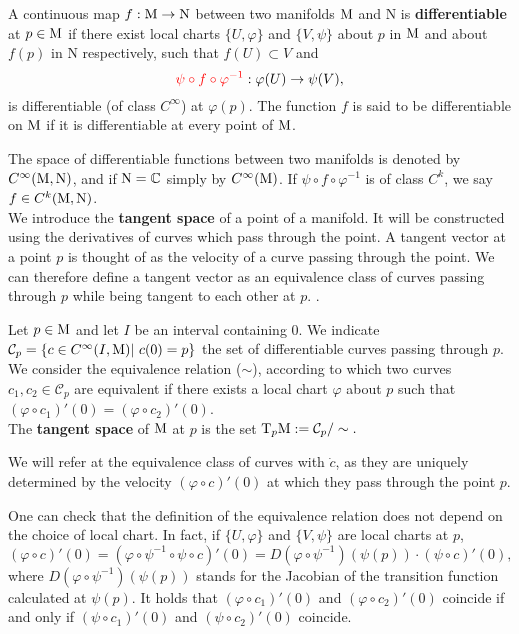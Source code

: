 \begin{definition}
	A continuous map $f:\mathrm{M}\to\mathrm{N}$ between two manifolds $\mathrm{M}$ and $\mathrm{N}$ is \textbf{differentiable} at $p\in\mathrm{M}$ if there exist local charts $\{U,\varphi\}$ and $\{V,\psi\}$ about $p$ in $\mathrm{M}$ and about $f(p)$ in $\mathrm{N}$ respectively, such that $f(U)\subset V$ and
	$$ \textcolor{red}{\psi\circ f\circ \varphi^{-1}}:\varphi(U)\to\psi(V),$$
	is differentiable (of class $C^\infty$) at $\varphi(p)$. The function $f$ is said to be differentiable on $\mathrm{M}$ if it is differentiable at every point of $\mathrm{M}$.
\end{definition}

	\noindent The space of differentiable functions between two manifolds is denoted by $C^\infty(\mathrm{M},\mathrm{N})$, and if $\mathrm{N}={\mathbb C}$ simply by $C^\infty(\mathrm{M})$. If $\psi\circ f\circ \varphi^{-1}$ is of class $C^k$, we say $f\in C^k(\mathrm{M},\mathrm{N})$.\\

	\noindent We introduce the \textbf{tangent space} of a point of a manifold. %
It will be constructed using the derivatives of curves which pass through the point. A tangent vector at a point $p$ is thought of as the velocity of a curve passing through the point. We can therefore define a tangent vector as an equivalence class of curves passing through $p$ while being tangent to each other at $p$.
.\begin{definition}
	Let $p\in\mathrm{M}$ and let $I$ be an interval containing $0$. We indicate $\mathcal{C}_p=\{c\in C^\infty(I,\mathrm{M})|\ c(0)=p\}$ the set of differentiable curves passing through $p$.\\
	We consider the equivalence relation ($\sim$), according to which two curves $c_1,c_2\in\mathcal{C}_p$ are equivalent if there exists a local chart $\varphi$ about $p$ such that $(\varphi\circ c_1)'(0)=(\varphi\circ c_2)'(0)$.\\
	The \textbf{tangent space} of $\mathrm{M}$ at $p$ is the set
	$\mathrm{T}_p\mathrm{M}:=\mathcal{C}_p/\sim.$
\end{definition}

\noindent We will refer at the equivalence class of curves with $\dot{c}$, as they are uniquely determined by the velocity $(\varphi\circ c)'(0)$ at which they pass through the point $p$.


	\noindent One can check that the definition of the equivalence relation does not depend on the choice of local chart. In fact, if $\{U,\varphi\}$ and $\{V,\psi\}$ are local charts at $p$,
\[ (\varphi\circ c)'(0)=(\varphi\circ\psi^{-1}\circ\psi\circ c)'(0)=D(\varphi\circ\psi^{-1})(\psi(p))\cdot(\psi\circ c)'(0),\]
where $D(\varphi\circ\psi^{-1})(\psi(p))$ stands for the Jacobian of the transition function calculated at $\psi(p)$. It holds that $(\varphi\circ c_1)'(0)$ and $(\varphi\circ c_2)'(0)$ coincide if and only if $(\psi\circ c_1)'(0)$ and $(\psi\circ c_2)'(0)$ coincide.\\

